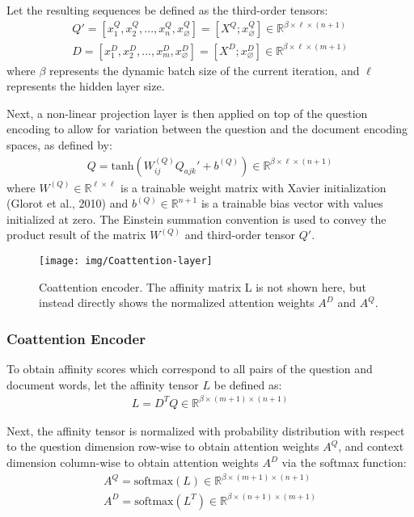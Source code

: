 \documentclass{article} %
\begin{document}
Let the resulting sequences be defined as the third-order tensors:
\begin{align}
  Q' = [x_1^Q , x_2^Q, ..., x_n^Q, x_\varnothing^Q] = [X^Q;x_\varnothing^Q] \in \mathbb{R}^{\beta\times \ell\times (n+1)} \\
  D  = [x_1^D , x_2^D, ..., x_m^D, x_\varnothing^D] = [X^D;x_\varnothing^D] \in \mathbb{R}^{\beta\times \ell\times (m+1)} 
\end{align}
where $\beta$ represents the dynamic batch size of the current iteration,
and $\ell$ represents the hidden layer size.

Next, a non-linear projection layer is then applied on top of the question encoding to allow
for variation between the question and the document encoding spaces,
as defined by:
\begin{align}
  Q = \text{tanh}(W_{ij}^{(Q)}Q_{ajk}' + b^{(Q)}) \in \mathbb{R}^{\beta\times \ell\times (n+1)}
\end{align}
where $W^{(Q)} \in \mathbb{R}^{\ell\times \ell}$ is a trainable weight matrix with
Xavier initialization (Glorot et al., 2010) and $b^{(Q)} \in \mathbb{R}^{n+1}$ is a trainable
bias vector with values initialized at zero.
The Einstein summation convention is used to convey the product result
of the matrix $W^{(Q)}$ and third-order tensor $Q'$.
 

\begin{center}%
\begin{figure}[h!]%
\hspace*{-1cm}%
\texttt{[image: img/Coattention-layer]}
\caption{Coattention encoder.
The affinity matrix L is not shown here, but 
instead directly shows the normalized attention weights $A^D$ and $A^Q$.
}
\label{fig:coattn}
\hspace*{-1cm}%
\end{figure}
\end{center}%

\subsubsection{Coattention Encoder}

To obtain affinity scores which correspond to all pairs
of the question and document words, let the affinity tensor $L$ be defined as:
\begin{align}
  L = D^TQ \in \mathbb{R}^{\beta\times (m+1)\times (n+1)}
\end{align}

Next, the affinity tensor is normalized with probability distribution with respect to
the question dimension row-wise to obtain attention weights $A^Q$,
and context dimension column-wise to obtain attention weights $A^D$ via the softmax function:
\begin{align}
  A^Q = \text{softmax}(L) \in \mathbb{R}^{\beta\times (m+1)\times (n+1)} \\
  A^D = \text{softmax}(L^T) \in \mathbb{R}^{\beta\times (n+1)\times (m+1)} \\
\end{align}
\end{document}
